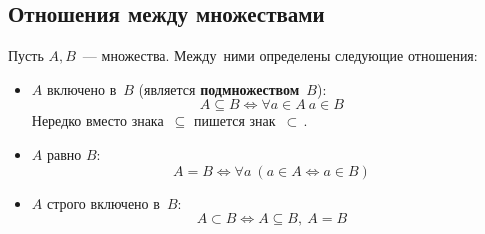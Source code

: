 \subsection{Отношения между множествами}
Пусть $A, B$~--- множества. Между~ними определены следующие отношения:
\begin{itemize}
	\item $A$ включено в~$B$ (является \textbf{подмножеством}~$B$):
	\begin{equation*}
	A \subseteq B \Leftrightarrow \forall a \in A \ a \in B
	\end{equation*}
	Нередко вместо знака~$\subseteq$ пишется знак~$\subset$\,.
	\item $A$ равно $B$:
	\begin{equation*}
	A = B \Leftrightarrow \forall a \ (a \in A \Leftrightarrow a \in B)
	\end{equation*}
	\item $A$ строго включено в~$B$:
	\begin{equation*}
	A \subset B \Leftrightarrow A \subseteq B, \ A = B
	\end{equation*}
\end{itemize}